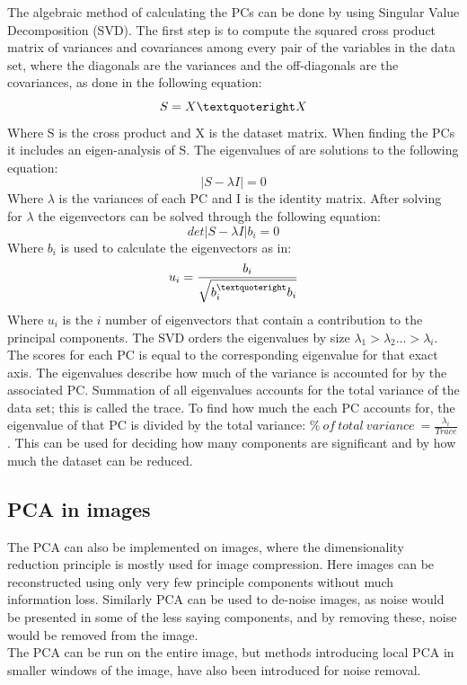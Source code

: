 The algebraic method of calculating the PCs can be done by using Singular Value Decomposition (SVD). The first step is to compute the squared cross product matrix of variances and covariances among every pair of the variables in the data set, where the diagonals are the variances and the off-diagonals are the covariances, as done in the following equation:
\begin{equation}
S = X \textquoteright X
\end{equation}
Where S is the cross product and X is the dataset matrix. When finding the PCs it includes an eigen-analysis of S. The eigenvalues of are solutions to the following equation:
\begin{equation}
| S - \lambda I |  = 0
\end{equation}
Where $\lambda$ is the variances of each PC and I is the identity matrix. After solving for $\lambda$ the eigenvectors can be solved through the following equation:
\begin{equation}
det | S - \lambda I | b_{i} = 0
\end{equation}
Where $b_{i}$ is used to calculate the eigenvectors as in:
\begin{eqnarray}
u_{i} = \frac{b_{i}}{\sqrt{b_{i}^{\textquoteright} b_{i}}}
\end{eqnarray}
Where $u_{i}$ is the $i$ number of eigenvectors that contain a contribution to the principal components.
The SVD orders the eigenvalues by size $\lambda_{1} > \lambda_{2} … > \lambda_{i}$. The scores for each PC is equal to the corresponding eigenvalue for that exact axis. The eigenvalues describe how much of the variance is accounted for by the associated PC. Summation of all eigenvalues accounts for the total variance of the data set; this is called the trace. To find how much the each PC accounts for, the eigenvalue of that PC is divided by the total variance: $\%~ of~ total~ variance~ = \frac{\lambda_{i}}{Trace}$. This can be used for deciding how many components are significant and by how much the dataset can be reduced. \cite{Semmlow2004}

\subsection{PCA in images}

The PCA can also be implemented on images, where the dimensionality reduction principle is mostly used for image compression. Here images can be reconstructed using only very few principle components without much information loss. Similarly PCA can be used to de-noise images, as noise would be presented in some of the less saying components, and by removing these, noise would be removed from the image. \\
The PCA can be run on the entire image, but methods introducing local PCA in smaller windows of the image, have also been introduced for noise removal. \cite{MuraliMohanBabu2012}   


